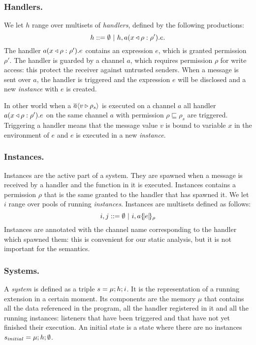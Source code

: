 \subsubsection{Handlers.} 
We let $h$ range over multisets of \emph{handlers}, defined by the following productions:
\[
h ::= \emptyset ~|~ h,\handler{a}{x}{\rho}{e}{\rho'}.
\]
The handler $\handler{a}{x}{\rho}{e}{\rho'}$ contains an expression $e$, which is granted permission $\rho'$. The handler is guarded by a channel $a$, which requires permission $\rho$ for write access: this protect the receiver against untrusted senders. When a message is sent over $a$, the handler is triggered and the expression $e$ will be disclosed and a new \emph{instance} with $e$ is created.

In other world when a $\send{a}{v}{\rho_s}$ is executed on a channel $a$ all handler $\handler{a}{x}{\rho}{e}{\rho'}$ on the same channel $a$ with permission $\rho \sqsubseteq \rho_s$ are triggered. Triggering a handler means that the message value $v$ is bound to variable $x$ in the environment of $e$ and $e$ is executed in a new \emph{instance}.

\subsubsection{Instances.} 
Instances are the active part of a system. They are spawned when a message is received by a handler and the function in it is executed. Instances contains a permission $\rho$ that is the same granted to the handler that has spawned it.
We let $i$ range over pools of running \emph{instances}.%
Instances are multisets defined as follows:
\[
i,j ::= \emptyset ~|~ i,\inst{a}{e}{\rho}
\]
Instances are annotated with the channel name corresponding to the handler which spawned them: this is convenient for our static analysis, but it is not important for the semantics.

\subsubsection{Systems.} 
A \emph{system} is defined as a triple $s = \sys{\mu}{h}{i}$. It is the representation of a running extension in a certain moment. Its components are the memory $\mu$ that contains all the data referenced in the program, all the handler registered in it and all the running instances: listeners that have been triggered and that have not yet finished their execution. An initial state is a state where there are no instances $s_{initial} = \sys{\mu}{h}{\emptyset}$.


